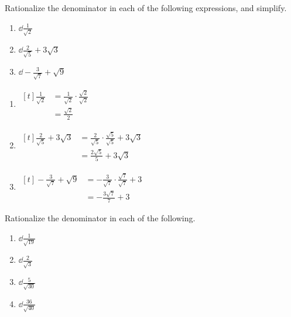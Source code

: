 \begin{myexample}
Rationalize the denominator in each of the following expressions, and \gls{simplify}.
\begin{multicols}{3}
	\begin{enumerate}
		\item $\dd\frac{1}{\sqrt{2}}$
		\item $\dd\frac{2}{\sqrt{5}}+3\sqrt{3}$
		\item $\dd -\frac{3}{\sqrt{7}}+\sqrt{9}$
	\end{enumerate}
\end{multicols}
\end{myexample}
\begin{myProof}
	\begin{enumerate}
		\item 
		$\begin{aligned}[t]
			\frac{1}{\sqrt{2}} & =  \frac{1}{\sqrt{2}}\cdot \frac{\sqrt{2}}{\sqrt{2}} \\
			                   & =  \frac{\sqrt{2}}{2}                                
		\end{aligned}$
		\item 
		$\begin{aligned}[t]
			\frac{2}{\sqrt{5}}+3\sqrt{3} & =  \frac{2}{\sqrt{5}}\cdot \frac{\sqrt{5}}{\sqrt{5}}	+3 \sqrt{3} \\
			                             & =  \frac{2\sqrt{5}}{5}+ 3 \sqrt{3}                               
		\end{aligned}$
		\item 
		$\begin{aligned}[t]
			-\frac{3}{\sqrt{7}}+\sqrt{9} & =  -\frac{3}{\sqrt{7}}\cdot \frac{\sqrt{7}}{\sqrt{7}}+3 \\
			                             & =  -\frac{3\sqrt{7}}{7} + 3                             
		\end{aligned}$
	\end{enumerate}
	{}
\end{myProof}

\begin{myexample}
\drillandskill
Rationalize the denominator in each of the following.
\end{myexample}
\begin{multicols}{4}
	\begin{enumerate}
		\item $\dd\frac{1}{\sqrt{19}}$
		\item $\dd\frac{2}{\sqrt{3}}$
		\item $\dd\frac{5}{\sqrt{30}}$
		\item $\dd\frac{36}{\sqrt{40}}$
	\end{enumerate}
\end{multicols}

